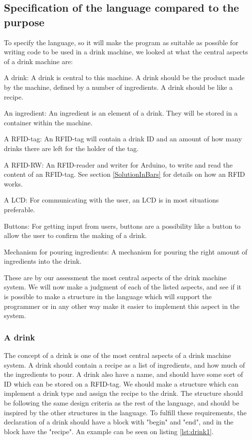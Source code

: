 \subsection{Specification of the language compared to the purpose}
To specify the language, so it will make the program as suitable as possible for writing code to be used in a drink machine, we looked at what the central aspects of a drink machine are:
\begin{inddes}
\item[A drink:] A drink is central to this machine. A drink should be the product made by the machine, defined by a number of ingredients. A drink should be like a recipe.
\item[An ingredient:] An ingredient is an element of a drink. They will be stored in a container within the machine. 
\item[A RFID-tag:] An RFID-tag will contain a drink ID and an amount of how many drinks there are left for the holder of the tag.
\item[A RFID-RW:] An RFID-reader and writer for Arduino, to write and read the content of an RFID-tag. See section \ref{SolutionInBars} for details on how an RFID works.
\item[A LCD:] For communicating with the user, an LCD is in most situations preferable.
\item[Buttons:] For getting input from users, buttons are a possibility like a button to allow the user to confirm the making of a drink. 
\item[Mechanism for pouring ingredients:] A mechanism for pouring the right amount of ingredients into the drink.
\end{inddes}
These are by our assessment the most central aspects of the drink machine system. We will now make a judgment of each of the listed aspects, and see if it is possible to make a structure in the language which will support the programmer or in any other way make it easier to implement this aspect in the system.
\subsubsection{A drink}
The concept of a drink is one of the most central aspects of a drink machine system. A drink should contain a recipe as a list of ingredients, and how much of the ingredients to pour. A drink also have a name, and should have some sort of ID which can be stored on a RFID-tag. We should make a structure which can implement a drink type and assign the recipe to the drink. The structure should be following the same design criteria as the rest of the language, and should be inspired by the other structures in the language. To fulfill these requirements, the declaration of a drink should have a block with "begin" and "end", and in the block have the "recipe". An example can be seen on listing \ref{lst:drink1}.

